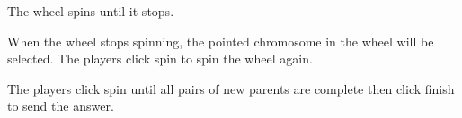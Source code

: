 \documentclass[12pt,oneside,openright,a4paper]{cpe-english-project}
\begin{document}
\begin{itemize}
\begin{enumerate}
		The wheel spins until it stops. \\
		\begin{minipage}[c]{\textwidth}\centering {}  \end{minipage}
		When the wheel stops spinning, the pointed chromosome in the wheel will be selected. The players click spin to spin the wheel again. \\
		\begin{minipage}[c]{\textwidth}\centering {}  \end{minipage}
		The players click spin until all pairs of new parents are complete then click finish to send the answer. \\
	\end{enumerate}


\end{itemize}
\end{document}
